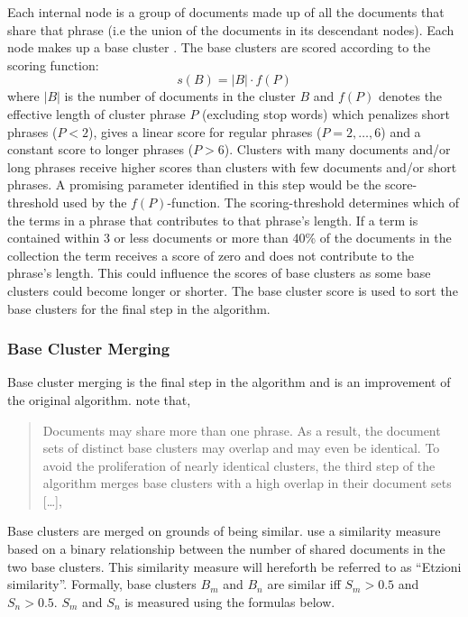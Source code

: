 Each internal node is a group of documents made up of all the documents that share that phrase (i.e the union of the documents in its descendant nodes). Each node makes up a base cluster \cite{Oren1998}. The base clusters are scored according to the scoring function: 
\begin{displaymath}s(B) = 
\vert B \vert \cdot f(P)
\end{displaymath} 
where \(\vert B \vert\) 
is the number of documents in the cluster \(B\) and  \(f(P)\) denotes the effective length of cluster phrase \(P\) (excluding stop words) which penalizes short phrases (\( P < 2\)), gives a linear score for regular phrases (\(P = {2,\dots,6}\)) and a constant score to longer phrases (\( P > 6\)). Clusters with many documents and/or long phrases receive higher scores than clusters with few documents and/or short phrases. A promising parameter identified in this step would be the score-threshold used by the \(f(P)\)-function. The scoring-threshold determines which of the terms in a phrase that contributes to that phrase's length. If a term is contained within 3 or less documents or more than 40\% of the documents in the collection the term receives a score of zero and does not contribute to the phrase's length. This could influence the scores of base clusters as some base clusters could become longer or shorter. The base cluster score is used to sort the base clusters for the final step in the \STC algorithm.

\subsubsection{Base Cluster Merging}
Base cluster merging is the final step in the \STC algorithm and is an improvement of the original algorithm. \citeauthor{Oren1998} note that,
\begin{quote}
Documents may share more than one phrase. As a result, the document sets of distinct base clusters may overlap and may even be identical. To avoid the proliferation of nearly identical clusters, the third step of the algorithm merges base clusters with a high overlap in their document sets [\dots], \parencite[][3]{Oren1998}
\end{quote}

Base clusters are merged on grounds of being similar. \citeauthor{Oren1998} use a similarity measure based on a binary relationship between the number of shared documents in the two base clusters. This similarity measure will hereforth be referred to as ``Etzioni similarity''. Formally, base clusters \(B_m\) and \(B_n\) are similar iff \(S_{m} > 0.5\) and \(S_{n} > 0.5 \). \(S_{m}\) and \(S_{n}\) is measured using the formulas below.

